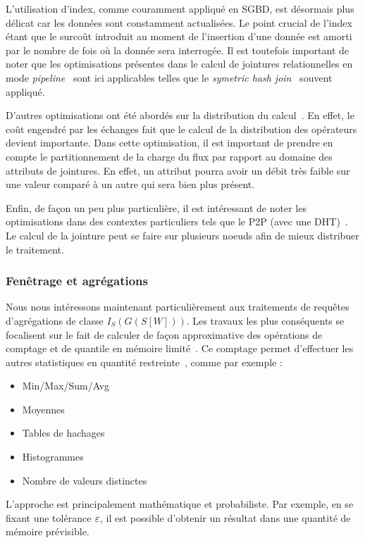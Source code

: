 L'utilisation d'index, comme couramment appliqué en SGBD, est désormais plus délicat car les données sont constamment actualisées. Le point crucial de l'index étant que le surcoût introduit au moment de l'insertion d'une donnée est amorti par le nombre de fois où la donnée sera interrogée. Il est toutefois important de noter que les optimisations présentes dans le calcul de jointures relationnelles en mode \textit{pipeline}~\cite{Gajski:pipeline} sont ici applicables telles que le \textit{symetric hash join}~\cite{Wilschut:symetricjoin} souvent appliqué.

D'autres optimisations ont été abordés sur la distribution du calcul~\cite{Zhou:pmjoin}. En effet, le coût engendré par les échanges fait que le calcul de la distribution des opérateurs devient importante. Dans cette optimisation, il est important de prendre en compte le partitionnement de la charge du flux par rapport au domaine des attributs de jointures. En effet, un attribut pourra avoir un débit très faible sur une valeur comparé à un autre qui sera bien plus présent.

Enfin, de façon un peu plus particulière, il est intéressant de noter les optimisations dans des contextes particuliers tels que le P2P (avec une DHT)~\cite{Palma:p2p}. Le calcul de la jointure peut se faire sur plusieurs noeuds afin de mieux distribuer le traitement.

\subsubsection{Fenêtrage et agrégations}
Nous nous intéressons maintenant particulièrement aux traitements de requêtes d'agrégations de classe $I_S(G(S[W]))$. Les travaux les plus conséquents se focalisent sur le fait de calculer de façon approximative des opérations de comptage et de quantile en mémoire limité~\cite{Arasu:window}. Ce comptage permet d'effectuer les autres statistiques en quantité restreinte~\cite{Datar:stats}, comme par exemple : 
\begin{itemize}
 \item Min/Max/Sum/Avg 
 \item Moyennes
 \item Tables de hachages
 \item Histogrammes
 \item Nombre de valeurs distinctes
\end{itemize}

L'approche est principalement mathématique et probabiliste. Par exemple, en se fixant une tolérance $\varepsilon$, il est possible d'obtenir un résultat dans une quantité de mémoire prévisible.

